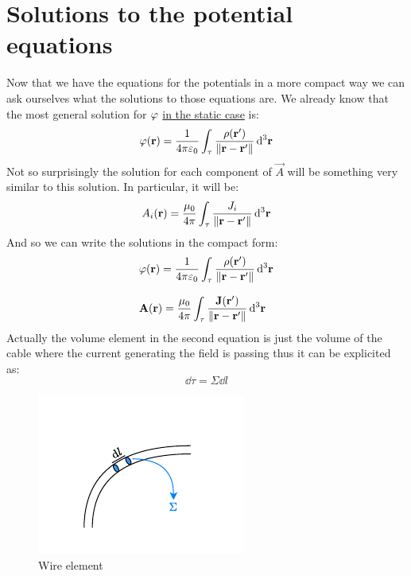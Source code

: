 \section{Solutions to the potential equations}
Now that we have the equations for the potentials in a more compact way we can ask ourselves what the solutions to those equations are. We already know that the most general solution for $\varphi$ \underline{in the static case} is:
\begin{equation}
  \varphi(\vb{r}) = \dfrac{1}{4 \pi \varepsilon_0}\int_{\tau} \dfrac{\rho (\vb{r}')}{\norm{\vb{r}-\vb{r}'}}\dd{^3 \vb{r}}
\end{equation}
Not so surprisingly the solution for each component of $\vec{A}$ will be something very similar to this solution. In particular, it will be:
\begin{equation}
  A_i(\vb{r}) = \dfrac{\mu_0}{4 \pi }\int_{\tau} \dfrac{J_i}{\norm{\vb{r}-\vb{r}'}}\dd{^3 \vb{r}}
\end{equation}
And so we can write the solutions in the compact form:
\begin{equation} \label{e:pot_general_solutions}
  \begin{split}
    &\varphi(\vb{r}) = \dfrac{1}{4 \pi \varepsilon_0}\int_{\tau} \dfrac{\rho (\vb{r}')}{\norm{\vb{r}-\vb{r}'}}\dd{^3 \vb{r}} \\[8pt]
    &\vb{A}(\vb{r}) = \dfrac{\mu_0}{4 \pi }\int_{\tau} \dfrac{\vb{J} (\vb{r}')}{\norm{\vb{r}-\vb{r}'}}\dd{^3 \vb{r}}
  \end{split}
\end{equation}
Actually the volume element in the second equation is just the volume of the cable where the current generating the field is passing thus it can be explicited as:
\begin{equation}
  \dd{\tau} = \Sigma \dd{l}
\end{equation}
\begin{figure}[H]
  \centering
  \includegraphics[width=0.5\linewidth]{res/svg/cable.drawio}
  \caption{Wire element}
\end{figure}
